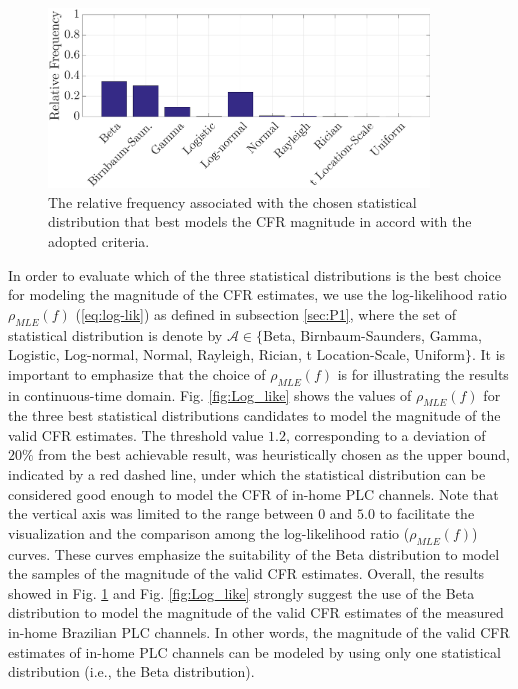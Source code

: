 \begin{figure}[h!]
	\centering
	\includegraphics[width=0.9\textwidth]{images/Mag_percent.eps}
	\caption{The relative frequency associated with the chosen statistical distribution that best models the CFR magnitude in accord with the adopted criteria.}
	\label{MAG_percent}
\end{figure}

In order to evaluate which of the three statistical distributions is the best choice for modeling the magnitude of the \ac{CFR} estimates, we use the log-likelihood ratio $\rho_{MLE} (f)$ (\ref{eq:log-lik}) as defined in subsection \ref{sec:P1}, where the set of statistical distribution is denote by $\mathcal{A}\in\{${Beta, Birnbaum-Saunders, Gamma, Logistic, Log-normal, Normal, Rayleigh, Rician, t Location-Scale, Uniform}$\}$. It is important to emphasize that the choice of $\rho_{MLE} (f)$ is for illustrating the results in continuous-time domain.  Fig. \ref{fig:Log_like} shows the values of $\rho_{MLE}(f)$ for the three best statistical distributions candidates to model the magnitude of the valid \ac{CFR} estimates. The threshold value $1.2$, corresponding to a deviation of $20\%$ from the best achievable result, was heuristically chosen as the upper bound, indicated by a red dashed line, under which the statistical distribution can be considered good enough to model the \ac{CFR} of in-home \ac{PLC} channels. Note that the vertical axis was limited to the range between $0$ and $5.0$ to facilitate the visualization and the comparison among the log-likelihood ratio ($\rho_{MLE} (f)$) curves. These curves emphasize the suitability of the Beta distribution to model the samples of the magnitude of the valid \ac{CFR} estimates. Overall, the results showed in Fig. \ref{MAG_percent} and Fig. \ref{fig:Log_like} strongly suggest the use of the Beta distribution to model the magnitude of the valid \ac{CFR} estimates of the measured in-home Brazilian \ac{PLC} channels. In other words, the magnitude of the valid \ac{CFR} estimates of in-home \ac{PLC} channels can be modeled by using only one statistical distribution (i.e., the Beta distribution).

